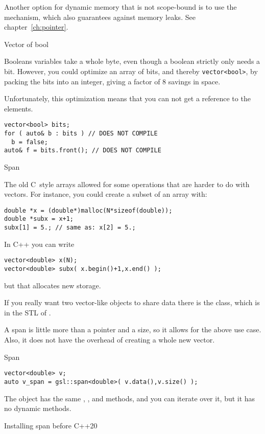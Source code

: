 Another option for dynamic memory that is not scope-bound
is to use the  mechanism,
which also guarantees against memory leaks. See chapter~\ref{ch:pointer}.

 {Vector of bool}

Booleans variables take a whole byte, even though
a boolean strictly only needs a bit.
However, you could optimize an array of bits,
and thereby \lstinline+vector<bool>+,
by packing the bits into an integer,
giving a factor of 8 savings in space.

Unfortunately, this optimization means that you can not
get a reference to the elements.
\begin{lstlisting}
vector<bool> bits;
for ( auto& b : bits ) // DOES NOT COMPILE
  b = false;
auto& f = bits.front(); // DOES NOT COMPILE
\end{lstlisting}

 {Span}
\label{sec:gsl-span}

The old C~style arrays allowed for some operations that are harder to
do with vectors. For instance, you could create a subset of an array with:
\begin{lstlisting}
double *x = (double*)malloc(N*sizeof(double));
double *subx = x+1;
subx[1] = 5.; // same as: x[2] = 5.;
\end{lstlisting}
In C++ you can write
\begin{lstlisting}
vector<double> x(N);
vector<double> subx( x.begin()+1,x.end() );
\end{lstlisting}
but that allocates new storage.

If you really want two vector-like objects to share data there is the
 class, which is in the \ac{STL} of .

A span is little more than a pointer and a size, so it allows for the
above use case. Also, it does not have the overhead of creating a
whole new vector.

\begin{block}{Span}
  \label{sl:spandef}
\begin{lstlisting}
vector<double> v;
auto v_span = gsl::span<double>( v.data(),v.size() );
\end{lstlisting}
The  object has the same , , and
 methods, and you can iterate over it, but it has no
dynamic methods.
\end{block}

 {Installing span before C++20}

